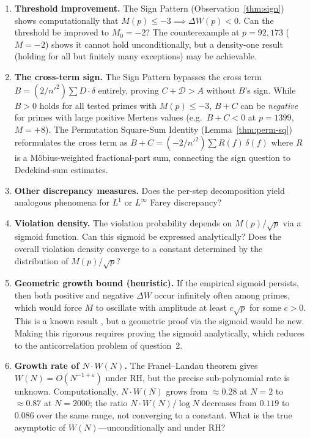 \documentclass[11pt]{article}
\theoremstyle{definition}
\begin{document}

\begin{enumerate}
  \item \textbf{Threshold improvement.}
    The Sign Pattern (Observation~\ref{thm:sign}) shows computationally that
    $M(p) \le -3 \implies \Delta W(p) < 0$.
    Can the threshold be improved to $M_0 = -2$?
    The counterexample at $p = 92{,}173$ ($M = -2$) shows it
    cannot hold unconditionally, but a density-one result
    (holding for all but finitely many exceptions) may be achievable.

  \item \textbf{The cross-term sign.}
    The Sign Pattern bypasses the cross term $B = (2/n'^2)\sum D
    \cdot \delta$ entirely, proving $C + \mathcal{D} > A$ without
    $B$'s sign.  While $B > 0$ holds
    for all tested primes with $M(p) \le -3$,
    $B + C$ can be \emph{negative} for primes with large positive
    Mertens values (e.g.\ $B + C < 0$ at $p = 1399$, $M = +8$).
    The Permutation Square-Sum Identity
    (Lemma~\ref{thm:perm-sq}) reformulates the cross term as
    $B + C = (-2/{n'}^2)\sum R(f)\,\delta(f)$ where $R$ is a
    M\"obius-weighted fractional-part sum, connecting
    the sign question to Dedekind-sum estimates.

  \item \textbf{Other discrepancy measures.}  Does the per-step
    decomposition yield analogous phenomena for $L^1$ or $L^\infty$
    Farey discrepancy?

  \item \textbf{Violation density.}  The violation probability
    depends on $M(p)/\sqrt{p}$ via a sigmoid function.  Can this
    sigmoid be expressed analytically?  Does the overall violation
    density converge to a constant determined by the distribution
    of $M(p)/\sqrt{p}$?

  \item \textbf{Geometric growth bound (heuristic).}  If the
    empirical sigmoid persists, then both positive and negative
    $\Delta W$ occur infinitely often among primes, which would
    force $M$ to oscillate with amplitude at least
    $c\sqrt{p}$ for some $c > 0$.  This is a known result
    \cite{Ingham1942}, but a geometric proof via the sigmoid would
    be new.  Making this rigorous requires proving the
    sigmoid analytically, which reduces to the anticorrelation
    problem of question~2.

  
  \item \textbf{Growth rate of $N \cdot W(N)$.}
    The Franel--Landau theorem gives $W(N) = O(N^{-1+\varepsilon})$
    under RH, but the precise sub-polynomial rate is unknown.
    Computationally, $N \cdot W(N)$ grows from $\approx 0.28$ at
    $N = 2$ to $\approx 0.87$ at $N = 2000$; the ratio
    $N \cdot W(N) / \log N$ decreases from $0.119$ to $0.086$ over
    the same range, not converging to a constant.  What is the
    true asymptotic of $W(N)$---unconditionally and under RH?


\end{enumerate}
\end{document}
